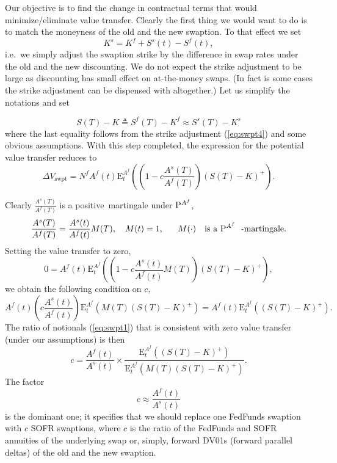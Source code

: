 \documentclass{article}
\begin{document}
Our objective is to find the change in contractual terms that would
minimize/eliminate value transfer. Clearly the first thing we would want to
do is to match the moneyness of the old and the new swaption. To that effect
we set%
\begin{equation}
K^{s}=K^{f}+S^{s}(t)-S^{f}(t),  \label{eq:swpt4}
\end{equation}%
i.e.\ we simply adjust the swaption strike by the difference in swap rates
under the old and the new discounting. We do not expect the strike
adjustment to be large as discounting has small effect on at-the-money
swaps. (In fact is some cases the strike adjustment can be dispensed with
altogether.) Let us simplify the notations and set

\begin{equation*}
S(T)-K\triangleq S^{f}(T)-K^{f}\approx S^{s}(T)-K^{s}
\end{equation*}%
where the last equality follows from the strike adjustment (\ref{eq:swpt4})
and some obvious assumptions. With this step completed, the expression for
the potential value transfer reduces to%
\begin{equation*}
\Delta V_{\mathrm{swpt}}=N^{f}A^{f}(t)\mathrm{E}_{t}^{A^{f}}\left( \left( 1-c%
\frac{A^{s}(T)}{A^{f}(T)}\right) \left( S(T)-K\right) ^{+}\right) .
\end{equation*}

Clearly $\frac{A^{s}(T)}{A^{f}(T)}$ is a positive\ martingale under $\mathrm{%
P}^{A^{f}}$,%
\begin{equation*}
\frac{A^{s}(T)}{A^{f}(T)}=\frac{A^{s}(t)}{A^{f}(t)}M(T),\quad M(t)=1,\text{%
\quad }M(\cdot )\text{ is a }\mathrm{P}^{A^{f}}\text{-martingale.}
\end{equation*}%
Setting the value transfer to zero, 
\begin{equation*}
0=A^{f}(t)\mathrm{E}_{t}^{A^{f}}\left( \left( 1-c\frac{A^{s}(t)}{A^{f}(t)}%
M(T)\right) (S(T)-K)^{+}\right) ,
\end{equation*}%
we obtain the following condition on $c$,%
\begin{equation*}
A^{f}(t)\left( c\frac{A^{s}(t)}{A^{f}(t)}\right) \mathrm{E}%
_{t}^{A^{f}}\left( M(T)(S(T)-K)^{+}\right) =A^{f}(t)\mathrm{E}%
_{t}^{A^{f}}\left( (S(T)-K)^{+}\right) .
\end{equation*}%
The ratio of notionals (\ref{eq:swpt1}) that is consistent with zero value
transfer (under our assumptions) is then%
\begin{equation}
c=\frac{A^{f}(t)}{A^{s}(t)}\times \frac{\mathrm{E}_{t}^{A^{f}}\left(
(S(T)-K)^{+}\right) }{\mathrm{E}_{t}^{A^{f}}\left( M(T)(S(T)-K)^{+}\right) }.
\label{eq:swpt2}
\end{equation}%
The factor 
\begin{equation}
c\approx \frac{A^{f}(t)}{A^{s}(t)}  \label{eq:c1}
\end{equation}%
is the dominant one; it specifies that we should replace one FedFunds
swaption with $c$ SOFR swaptions, where $c$ is the ratio of the FedFunds and
SOFR annuities of the underlying swap or, simply, forward DV01s (forward
parallel deltas) of the old and the new swaption.
\end{document}
